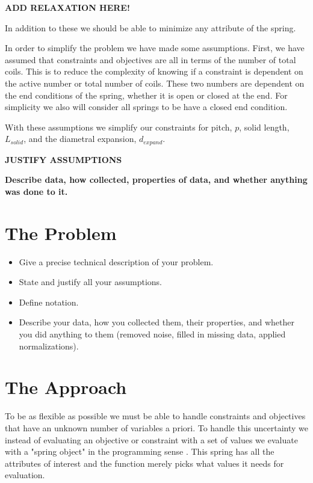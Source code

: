 \documentclass[10pt]{article}
\begin{document}
\textbf{ADD RELAXATION HERE!}


In addition to these we should be able to minimize any attribute of the spring. 

In order to simplify the problem we have made some assumptions. First, we have assumed that constraints and objectives are all in terms of the number of total coils. This is to reduce the complexity of knowing if a constraint is dependent on the active number or total number of coils. These two numbers are dependent on the end conditions of the spring, whether it is open or closed at the end. For simplicity we also will consider all springs to be have a closed end condition. 

With these assumptions we simplify our constraints for pitch, $p$, solid length, $L_{solid}$, and the diametral expansion, $d_{expand}$. 

\textbf{JUSTIFY ASSUMPTIONS}

\textbf{Describe data, how collected, properties of data, and whether anything was done to it.}

\section{The Problem}
\begin{itemize}
\item Give a precise technical description of your problem. 

\item State and justify all your assumptions. 

\item Define notation. 

\item Describe your data, how you collected them, their properties,
and whether you did 
anything to them (removed noise, filled in missing data, 
applied normalizations).
\end{itemize}


\section{The Approach}

To be as flexible as possible we must be able to handle constraints and objectives that have an unknown number of  variables a priori. To handle this uncertainty we instead of evaluating an objective or constraint with a set of values we evaluate with a "spring object" in the programming sense \cite{OOP}. This spring has all the attributes of interest and the function merely picks what values it needs for evaluation. 
\end{document}
